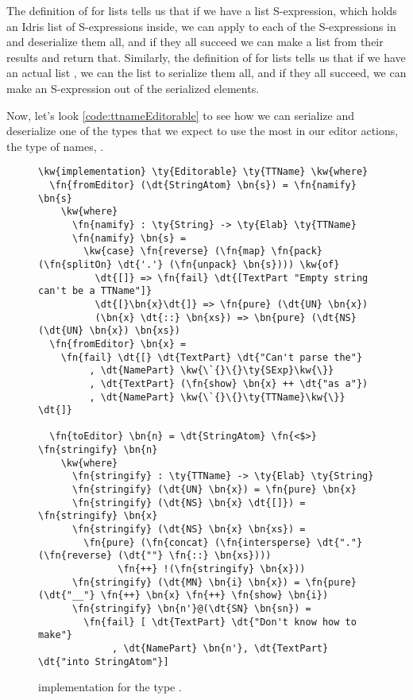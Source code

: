 The definition of  for lists tells us that if we have a list
S-expression, which holds an Idris list  of
S-expressions inside, we can apply  to each of the S-expressions
in  and deserialize them all, and if they all succeed we can make a list
from their results and return that.
Similarly, the definition of  for lists tells us that if we have an
actual list , we can  the list to serialize them all, and
if they all succeed, we can make an S-expression out of the serialized
elements.

Now, let's look \autoref{code:ttnameEditorable} to see how we can serialize and
deserialize one of the types that we expect to use the most in our editor
actions, the type of names, .

\begin{figure}[ht]
\caption{ implementation for the type .}
\label{code:ttnameEditorable}
\begin{Verbatim}[framesep=2mm, label=\footnotesize{\normalfont{Idris}}, labelposition=topline]
\kw{implementation} \ty{Editorable} \ty{TTName} \kw{where}
  \fn{fromEditor} (\dt{StringAtom} \bn{s}) = \fn{namify} \bn{s}
    \kw{where}
      \fn{namify} : \ty{String} -> \ty{Elab} \ty{TTName}
      \fn{namify} \bn{s} =
        \kw{case} \fn{reverse} (\fn{map} \fn{pack} (\fn{splitOn} \dt{'.'} (\fn{unpack} \bn{s}))) \kw{of}
          \dt{[]} => \fn{fail} \dt{[TextPart "Empty string can't be a TTName"]}
          \dt{[}\bn{x}\dt{]} => \fn{pure} (\dt{UN} \bn{x})
          (\bn{x} \dt{::} \bn{xs}) => \bn{pure} (\dt{NS} (\dt{UN} \bn{x}) \bn{xs})
  \fn{fromEditor} \bn{x} =
    \fn{fail} \dt{[} \dt{TextPart} \dt{"Can't parse the"}
         , \dt{NamePart} \kw{\`{}\{}\ty{SExp}\kw{\}}
         , \dt{TextPart} (\fn{show} \bn{x} ++ \dt{"as a"})
         , \dt{NamePart} \kw{\`{}\{}\ty{TTName}\kw{\}} \dt{]}

  \fn{toEditor} \bn{n} = \dt{StringAtom} \fn{<$>} \fn{stringify} \bn{n}
    \kw{where}
      \fn{stringify} : \ty{TTName} -> \ty{Elab} \ty{String}
      \fn{stringify} (\dt{UN} \bn{x}) = \fn{pure} \bn{x}
      \fn{stringify} (\dt{NS} \bn{x} \dt{[]}) = \fn{stringify} \bn{x}
      \fn{stringify} (\dt{NS} \bn{x} \bn{xs}) =
        \fn{pure} (\fn{concat} (\fn{intersperse} \dt{"."} (\fn{reverse} (\dt{""} \fn{::} \bn{xs})))
              \fn{++} !(\fn{stringify} \bn{x}))
      \fn{stringify} (\dt{MN} \bn{i} \bn{x}) = \fn{pure} (\dt{"__"} \fn{++} \bn{x} \fn{++} \fn{show} \bn{i})
      \fn{stringify} \bn{n'}@(\dt{SN} \bn{sn}) =
        \fn{fail} [ \dt{TextPart} \dt{"Don't know how to make"}
             , \dt{NamePart} \bn{n'}, \dt{TextPart} \dt{"into StringAtom"}]
\end{Verbatim}
\end{figure}

